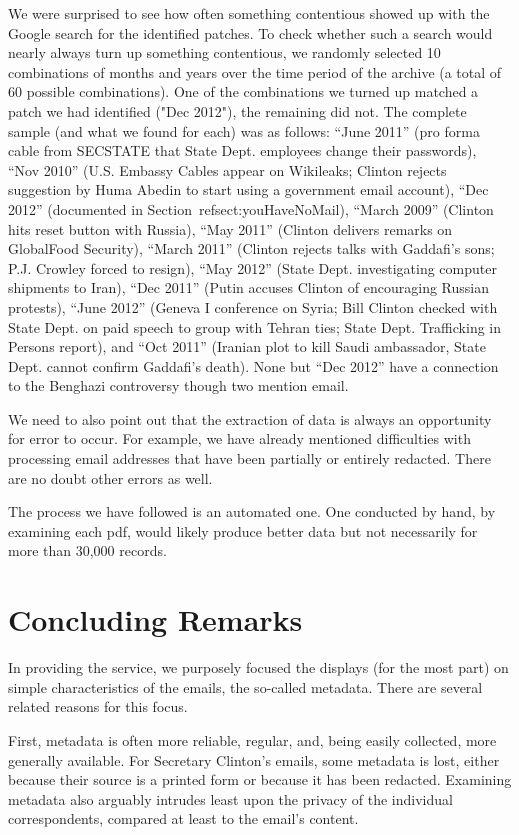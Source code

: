 \documentclass[journal]{vgtc}                %
\begin{document}
We were surprised to see how often something contentious showed up with the Google search for the identified patches.   To check whether such a search would nearly always turn up something contentious, we randomly selected 10 combinations of months and years over the time period of the archive (a total of 60 possible combinations).  One of the combinations we turned up matched a patch we had identified ("Dec 2012"), the remaining did not.  The complete sample (and what we found for each) was as follows:  ``June 2011''  (pro forma cable from SECSTATE that State Dept. employees change their passwords), ``Nov 2010''  (U.S. Embassy Cables appear on Wikileaks; Clinton rejects suggestion by Huma Abedin to start using  a government email account),   ``Dec 2012'' (documented in Section~ref{sect:youHaveNoMail}), ``March 2009'' (Clinton hits reset button with Russia), ``May 2011'' (Clinton delivers remarks on GlobalFood Security), ``March 2011'' (Clinton rejects talks with Gaddafi's sons; P.J. Crowley forced to resign), ``May 2012'' (State Dept. investigating computer shipments to Iran), ``Dec 2011'' (Putin accuses Clinton of encouraging Russian protests), ``June 2012'' (Geneva I conference on Syria; Bill Clinton checked with State Dept. on paid speech to group with Tehran ties; State Dept. Trafficking in Persons report), and  ``Oct 2011'' (Iranian plot to kill Saudi ambassador, State Dept. cannot confirm Gaddafi's death).   None but ``Dec 2012'' have a connection to the Benghazi controversy though two mention email.
 
 We need to also point out that the extraction of data is always an opportunity for error to occur.   For example, we have already mentioned difficulties with processing email addresses that have been partially or entirely redacted.  There are no doubt other errors as well.  
 
 The process we have followed is an automated one.  One conducted by hand, by examining each pdf, would likely produce better data but not necessarily for more than 30,000 records.  
 
\section{Concluding Remarks}
In providing the service, we purposely focused the displays (for the most part) on simple characteristics of the emails, the so-called metadata.  There are several related reasons for this focus.  

First, metadata is often more reliable, regular, and, being easily collected, more generally available.  For Secretary Clinton's emails,  some metadata is lost, either because their source is a printed form or because it has been redacted.  Examining metadata also arguably intrudes least upon the privacy of the individual correspondents, compared at least to the email's content.  
\end{document}
